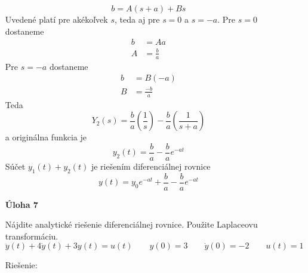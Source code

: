 \documentclass[a4paper, 10pt, ]{article}
\begin{document}
\begin{itemize}[leftmargin=0pt, labelsep=3mm, itemsep=0pt]
\begin{equation}
        b = A (s + a) + B s	
    \end{equation}
    Uvedené platí pre akékoľvek $s$, teda aj pre $s = 0$ a $s = -a$. Pre $s = 0$ dostaneme
    \begin{subequations}
        \begin{align}
            b &= A a \\
            A &= \frac{b}{a}
        \end{align}
    \end{subequations}
    Pre $s = -a$ dostaneme
    \begin{subequations}
        \begin{align}
            b &= B (-a) \\
            B &= \frac{-b}{a}
        \end{align}
    \end{subequations}
    Teda
    \begin{equation}
        Y_2(s) = \frac{b}{a} \left( \frac{1}{s} \right) - \frac{b}{a} \left( \frac{1}{s + a} \right)
    \end{equation}
    a originálna funkcia je
    \begin{equation}
        y_2(t) = \frac{b}{a} - \frac{b}{a} e^{-at}  
    \end{equation}
    Súčet $y_1(t) + y_2(t)$ je riešením diferenciálnej rovnice
    \begin{equation}
        y(t) = y_0 e^{-at} + \frac{b}{a} - \frac{b}{a} e^{-at}
    \end{equation}






            



    \item[\textsf{\bfseries Úloha 7}] {\sffamily%
    Nájdite analytické riešenie diferenciálnej rovnice. Použite Laplaceovu transformáciu.
    \begin{equation*} 
        \ddot y(t) + 4 \dot y(t) + 3y(t) = u(t)    \qquad y(0) = 3 \qquad \dot y(0) = -2  \qquad u(t) = 1 
    \end{equation*}
        
    Riešenie:}


\end{itemize}
\end{document}
